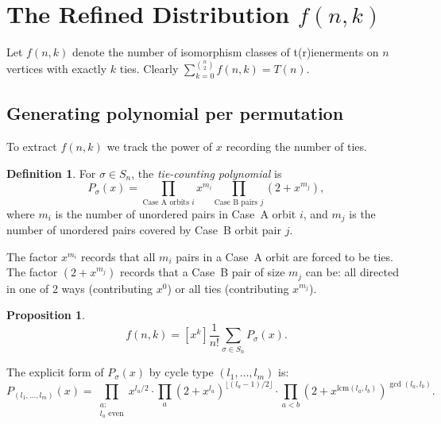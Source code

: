 \documentclass[12pt,reqno]{amsart}
\newtheorem{proposition}[theorem]{Proposition}
\theoremstyle{definition}
\newtheorem{definition}[theorem]{Definition}
\theoremstyle{plain}
\newcommand{\lcm}{\mathrm{lcm}}
\newcommand{\floor}[1]{\lfloor #1 \rfloor}
\begin{document}
\section{The Refined Distribution \texorpdfstring{$f(n,k)$}{f(n,k)}}
\label{sec:distribution}

Let $f(n,k)$ denote the number of isomorphism classes of t(r)ienerments on $n$
vertices with exactly $k$ ties.  Clearly $\sum_{k=0}^{\binom{n}{2}}f(n,k)=T(n)$.

\subsection{Generating polynomial per permutation}

To extract $f(n,k)$ we track the power of $x$ recording the number of ties.

\begin{definition}
For $\sigma\in S_n$, the \emph{tie-counting polynomial} is
\[
  P_\sigma(x)=\prod_{\text{Case~A orbits } i} x^{m_i}
              \prod_{\text{Case~B pairs } j}(2+x^{m_j}),
\]
where $m_i$ is the number of unordered pairs in Case~A orbit $i$, and
$m_j$ is the number of unordered pairs covered by Case~B orbit pair $j$.
\end{definition}

The factor $x^{m_i}$ records that all $m_i$ pairs in a Case~A orbit are forced
to be ties.  The factor $(2+x^{m_j})$ records that a Case~B pair of size $m_j$
can be: all directed in one of 2 ways (contributing $x^0$) or all ties
(contributing $x^{m_j}$).

\begin{proposition}\label{prop:gen-poly}
\[
  f(n,k)=[x^k]\frac{1}{n!}\sum_{\sigma\in S_n}P_\sigma(x).
\]
\end{proposition}

The explicit form of $P_\sigma(x)$ by cycle type $(l_1,\ldots,l_m)$ is:
\begin{equation}\label{eq:poly-explicit}
  P_{(l_1,\ldots,l_m)}(x)
  =\prod_{\substack{a:\\ l_a\text{ even}}} x^{l_a/2}
   \cdot
   \prod_a (2+x^{l_a})^{\floor{(l_a-1)/2}}
   \cdot
   \prod_{a<b}(2+x^{\lcm(l_a,l_b)})^{\gcd(l_a,l_b)}.
\end{equation}
\end{document}
